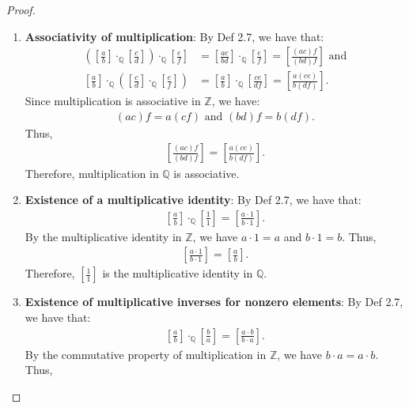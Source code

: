 \documentclass[11pt]{article}
\begin{document}
\begin{proof}
\begin{enumerate}[label=(\alph*)]
\begin{align*}
    \end{align*}
    Thus multiplication in $\mathbb{Q}$ is commutative.
    \item \textbf{Associativity of multiplication}:
    By Def 2.7, we have that:
    \begin{align*}
    \left(\left[\frac{a}{b}\right]\cdot_{\mathbb{Q}} \left[\frac{c}{d}\right] \right)\cdot_{\mathbb{Q}} \left[\frac{e}{f}\right] &= \left[\frac{ac}{bd}\right] \cdot_{\mathbb{Q}} \left[\frac{e}{f}\right] = \left[\frac{(ac)f}{(bd)f}\right] \text{ and} \\
    \left[\frac{a}{b}\right]\cdot_{\mathbb{Q}} \left( \left[\frac{c}{d}\right] \cdot_{\mathbb{Q}} \left[\frac{e}{f}\right]\right) &= \left[\frac{a}{b}\right] \cdot_{\mathbb{Q}} \left[\frac{ce}{df}\right] = \left[\frac{a(ce)}{b(df)}\right].
    \end{align*}
    Since multiplication is associative in $\mathbb{Z}$, we have:
    \begin{align*}
    (ac)f = a(cf) \text{ and } (bd)f = b(df).
    \end{align*}
    Thus,
    \begin{align*}
    \left[\frac{(ac)f}{(bd)f}\right] = \left[\frac{a(ce)}{b(df)}\right].
    \end{align*}
    Therefore, multiplication in $\mathbb{Q}$ is associative.
    \item \textbf{Existence of a multiplicative identity}:
    By Def 2.7, we have that:
    \begin{align*}
    \left[\frac{a}{b}\right] \cdot_{\mathbb{Q}}\left[\frac{1}{1}\right] = \left[\frac{a \cdot 1}{b \cdot 1}\right].
    \end{align*}
    By the multiplicative identity in $\mathbb{Z}$, we have $a \cdot 1 = a$ and $b \cdot 1 = b$. Thus,
    \begin{align*}
    \left[\frac{a \cdot 1}{b \cdot 1}\right] = \left[\frac{a}{b}\right].
    \end{align*}
    Therefore, $\left[\frac{1}{1}\right]$ is the multiplicative identity in $\mathbb{Q}$.
    \item \textbf{Existence of multiplicative inverses for nonzero elements}:
    By Def 2.7, we have that:
    \begin{align*}
    \left[\frac{a}{b}\right] \cdot_{\mathbb{Q}}\left[\frac{b}{a}\right] = \left[\frac{a \cdot b}{b \cdot a}\right].
    \end{align*}
    By the commutative property of multiplication in $\mathbb{Z}$, we have $b \cdot a = a \cdot b$. Thus,

\end{enumerate}
\end{proof}
\end{document}
